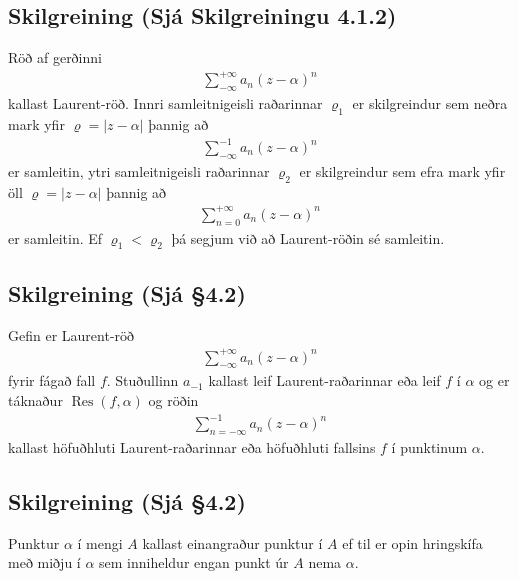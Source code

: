 \documentclass[a4paper,10pt,icelandic]{sphinxmanual}
\begin{document}
\subsection{Skilgreining (Sjá Skilgreiningu 4.1.2)}
\label{\detokenize{Kafli04:skilgreining-sja-skilgreiningu-4-1-2}}
Röð af gerðinni
\begin{equation*}
\begin{split}\sum_{-\infty}^{+\infty}a_n(z-\alpha)^ n\end{split}
\end{equation*}
kallast Laurent-röð. Innri samleitnigeisli raðarinnar \(\varrho_1\) er skilgreindur sem neðra mark yfir \(\varrho=|z-\alpha|\) þannig að
\begin{equation*}
\begin{split}\sum_{-\infty}^{-1} a_n(z-{\alpha})^ n\end{split}
\end{equation*}
er samleitin, ytri samleitnigeisli raðarinnar \(\varrho_2\) er skilgreindur sem efra mark yfir öll \(\varrho=|z-\alpha|\) þannig að
\begin{equation*}
\begin{split}\sum_{n=0}^{+\infty}a_n(z-{\alpha})^ n\end{split}
\end{equation*}
er samleitin. Ef \(\varrho_1<\varrho_2\) þá segjum við að Laurent-röðin sé samleitin.


\subsection{Skilgreining (Sjá \S{}4.2)}
\label{\detokenize{Kafli04:skilgreining-sja-4-2}}
Gefin er Laurent-röð
\begin{equation*}
\begin{split}\sum_{-\infty}^{+\infty}a_n(z-\alpha)^ n\end{split}
\end{equation*}
fyrir fágað fall \(f\). Stuðullinn \(a_{-1}\) kallast leif Laurent-raðarinnar eða leif \(f\) í \(\alpha\) og er táknaður \(\operatorname{Res}(f,\alpha)\) og röðin
\begin{equation*}
\begin{split}\sum_{n=-\infty}^{-1}a_n(z-{\alpha})^ n\end{split}
\end{equation*}
kallast höfuðhluti Laurent-raðarinnar eða höfuðhluti fallsins \(f\) í punktinum \(\alpha\).


\subsection{Skilgreining  (Sjá \S{}4.2)}
\label{\detokenize{Kafli04:id1}}
Punktur \(\alpha\) í mengi \(A\) kallast einangraður punktur í \(A\) ef til er opin hringskífa með miðju í \(\alpha\) sem inniheldur engan punkt úr \(A\) nema \(\alpha\).
\end{document}
